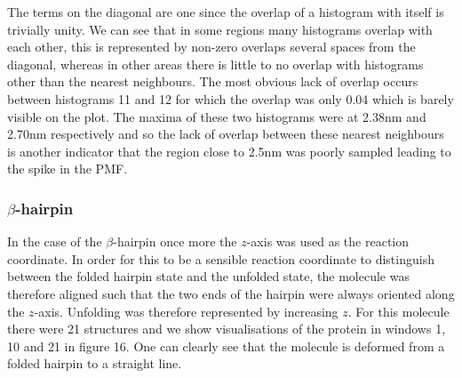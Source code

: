 \documentclass[12pt, onecolumn]{revtex4}    %
\begin{document}
The terms on the diagonal are one since the overlap of a histogram with itself is trivially unity.  We can see that in some regions many histograms overlap with each other, this is represented by non-zero overlaps several spaces from the diagonal, whereas in other areas there is little to no overlap with histograms other than the nearest neighbours.  The most obvious lack of overlap occurs between histograms 11 and 12 for which the overlap was only 0.04 which is barely visible on the plot.  The maxima of these two histograms were at 2.38nm and 2.70nm respectively and so the lack of overlap between these nearest neighbours is another indicator that the region close to 2.5nm was poorly sampled leading to the spike in the PMF.     

\subsubsection{$\beta$-hairpin}

In the case of the $\beta$-hairpin once more the $z$-axis was used as the reaction coordinate.  In order for this to be a sensible reaction coordinate to distinguish between the folded hairpin state and the unfolded state, the molecule was therefore aligned such that the two ends of the hairpin were always oriented along the $z$-axis.  Unfolding was therefore represented by increasing $z$.  For this molecule there were 21 structures and we show visualisations of the protein in windows 1, 10 and 21 in figure 16.  One can clearly see that the molecule is deformed from a folded hairpin to a straight line.\\
\end{document}
